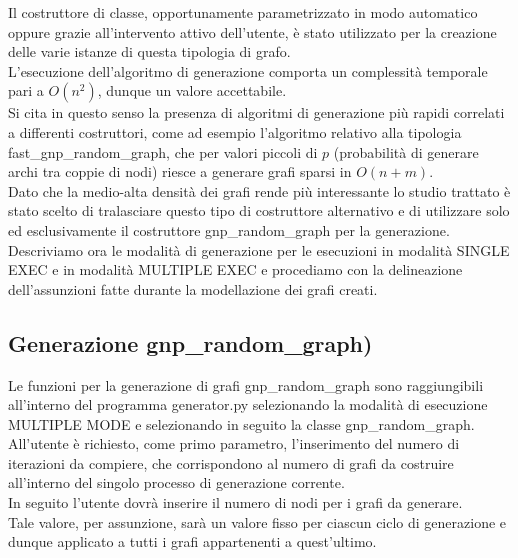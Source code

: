 Il costruttore di classe, opportunamente parametrizzato in modo automatico oppure grazie all'intervento attivo dell'utente, è stato utilizzato per la creazione delle varie istanze di questa tipologia di grafo.\\

L'esecuzione dell'algoritmo di generazione comporta un complessità temporale pari a \(O(n^2)\), dunque un valore accettabile.\\
Si cita in questo senso la presenza di algoritmi di generazione più rapidi correlati a differenti costruttori, come ad esempio l'algoritmo relativo alla tipologia fast\_gnp\_random\_graph, che per valori piccoli di $p$ (probabilità di generare archi tra coppie di nodi) riesce a generare grafi sparsi in \(O(n+m)\).\\

Dato che la medio-alta densità dei grafi rende più interessante lo studio trattato è stato scelto di tralasciare questo tipo di costruttore alternativo e di utilizzare solo ed esclusivamente il costruttore gnp\_random\_graph per la generazione.\\

Descriviamo ora le modalità di generazione per le esecuzioni in modalità SINGLE EXEC e in modalità MULTIPLE EXEC e procediamo con la delineazione dell'assunzioni fatte durante la modellazione dei grafi creati.\\

\subsection{Generazione gnp\_random\_graph)}
\justify
Le funzioni per la generazione di grafi gnp\_random\_graph sono raggiungibili all'interno del programma generator.py selezionando la modalità di esecuzione MULTIPLE MODE e selezionando in seguito la classe gnp\_random\_graph.\\

All'utente è richiesto, come primo parametro, l'inserimento del numero di iterazioni da compiere, che corrispondono al numero di grafi da costruire all'interno del singolo processo di generazione corrente.\\

In seguito l'utente dovrà inserire il numero di nodi per i grafi da generare.\\
Tale valore, per assunzione, sarà un valore fisso per ciascun ciclo di generazione e dunque applicato a tutti i grafi appartenenti a quest'ultimo.\\

